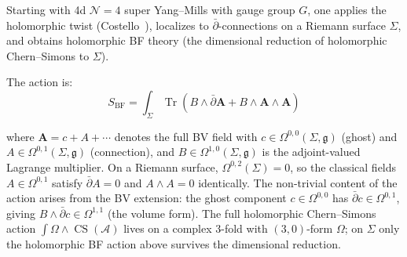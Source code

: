 \begin{theorem}[HT theory from 4d \texorpdfstring{$\mathcal{N}=4$}{N=4} SYM]
\label{thm:ht-from-n4-sym}
Starting with 4d $\mathcal{N}=4$ super Yang--Mills with gauge group $G$, one applies the holomorphic twist (Costello~\cite{costello-gaiotto}), localizes to $\bar{\partial}$-connections on a Riemann surface $\Sigma$, and obtains holomorphic BF theory (the dimensional reduction of holomorphic Chern--Simons to $\Sigma$).

The action is:
\[S_{\text{BF}} = \int_{\Sigma} \operatorname{Tr}\!\left(B \wedge \bar{\partial} \mathbf{A} + B \wedge \mathbf{A} \wedge \mathbf{A}\right)\]

where $\mathbf{A} = c + A + \cdots$ denotes the full BV field with $c \in \Omega^{0,0}(\Sigma, \mathfrak{g})$ (ghost) and $A \in \Omega^{0,1}(\Sigma, \mathfrak{g})$ (connection), and $B \in \Omega^{1,0}(\Sigma, \mathfrak{g})$ is the adjoint-valued Lagrange multiplier.
On a Riemann surface, $\Omega^{0,2}(\Sigma) = 0$, so the classical fields
$A \in \Omega^{0,1}$ satisfy $\bar{\partial}A = 0$ and $A \wedge A = 0$ identically. The non-trivial
content of the action arises from the BV extension: the ghost component $c \in \Omega^{0,0}$ has
$\bar{\partial}c \in \Omega^{0,1}$, giving $B \wedge \bar{\partial}c \in \Omega^{1,1}$ (the volume form).
The full holomorphic Chern--Simons action $\int \Omega \wedge \operatorname{CS}(\mathcal{A})$ lives on a
complex $3$-fold with $(3,0)$-form $\Omega$; on $\Sigma$ only the holomorphic BF action above survives the dimensional reduction.
\end{theorem}


